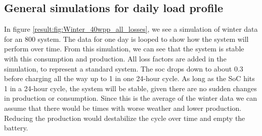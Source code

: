\subsection{General simulations for daily load profile}
In figure \ref{result:fig:Winter_40wpp_all_losses}, we see a simulation of winter data for an 800 system. The data for one day is looped to show how the system will perform over time. From this simulation, we can see that the system is stable with this consumption and production. All loss factors are added in the simulation, to represent a standard system. The \acrfull{soc} drops down to about 0.3 before charging all the way up to 1 in one 24-hour cycle. As long as the SoC hits 1 in a 24-hour cycle, the system will be stable, given there are no sudden changes in production or consumption. Since this is the average of the winter data we can assume that there would be times with worse weather and lower production. Reducing the production would destabilize the cycle over time and empty the battery. 
